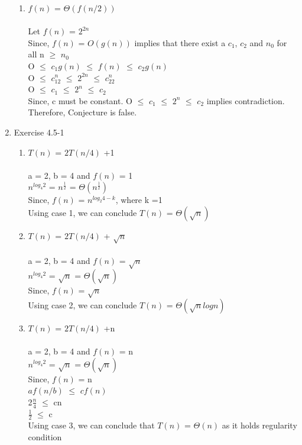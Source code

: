 \documentclass{article}
\begin{document}
\begin{enumerate}
\begin{enumerate}
    \item $f(n)$ = $\Theta(f(n/2))$\\\\
    Let $f(n)$ = $2^{2n}$\\
    Since, $f(n)$ = $O(g(n))$ implies that there exist a $c_1$, $c_2$ and $n_0$ for all n $\geq$ $n_0$\\
    O $\leq$ $c_1g(n)$ $\leq$ $f(n)$ $\leq$ $c_2g(n)$\\
    O $\leq$ $c_12^n$ $\leq$ $2^{2n}$ $\leq$ $c_22^n$\\
    O $\leq$ $c_1$ $\leq$ $2^n$ $\leq$ $c_2$\\
    Since, c must be constant. O $\leq$ $c_1$ $\leq$ $2^n$ $\leq$ $c_2$ implies contradiction.\\
    Therefore, Conjecture is false.\\
    \end{enumerate}
    \item Exercise 4.5-1
    \begin{enumerate}
        \item $T(n)$ = $2T(n/4)$ +1\\\\
        a = 2, b = 4 and $f(n)$ = 1\\
        $n^{log_4^{}2}$ = $n^{\frac{1}{2}}$ = $\Theta(n^\frac{1}{2})$\\
        Since, $f(n)$ = $n^{log_2^{}4-k} $,  where k =1\\
        Using case 1, we can conclude $T(n)$ = $\Theta(\sqrt{n})$\\
        \item $T(n)$ = $2T(n/4)$ + $\sqrt{n}$\\\\
        a = 2, b = 4 and $f(n)$ = $\sqrt{n}$\\
        $n^{log_4^{}2}$ = $\sqrt{n}$ = $\Theta(\sqrt{n})$\\
        Since, $f(n)$ =   $\sqrt{n}$\\
        Using case 2, we can conclude $T(n)$ = $\Theta(\sqrt{n}logn)$\\
        \item $T(n)$ = $2T(n/4)$ +n\\\\
        a = 2, b = 4 and $f(n)$ = n\\
        $n^{log_4^{}2}$ = $\sqrt{n}$ = $\Theta(\sqrt{n})$\\
        Since, $f(n)$ = n\\
        $af(n/b)$ $\leq$ $cf(n)$\\
        2$\frac{n}{4}$ $\leq$ cn\\
        $\frac{1}{2}$ $\leq$ c\\
        Using case 3, we can conclude that $T(n)$ = $\Theta(n)$  as it holds regularity condition\\
    

\end{enumerate}
\end{enumerate}
\end{document}

